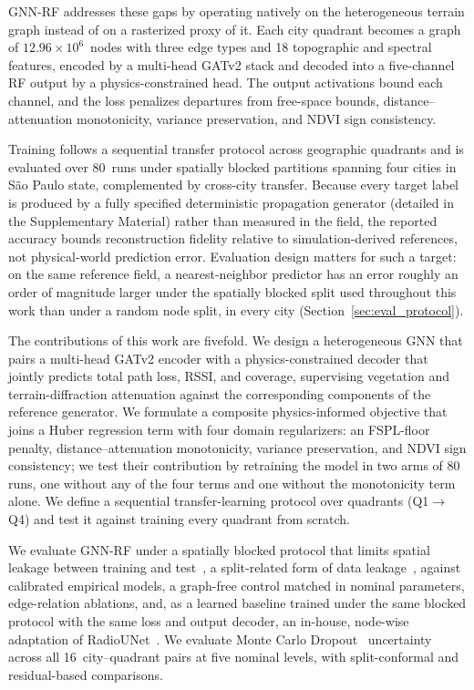 \documentclass{ieeeaccess}
\begin{document}
GNN-RF addresses these gaps by operating natively on the heterogeneous terrain graph instead of on a rasterized proxy of it. Each city quadrant becomes a graph of $12.96 \times 10^6$~nodes with three edge types and 18 topographic and spectral features, encoded by a multi-head GATv2 stack and decoded into a five-channel RF output by a physics-constrained head. The output activations bound each channel, and the loss penalizes departures from free-space bounds, distance--attenuation monotonicity, variance preservation, and NDVI sign consistency.

Training follows a sequential transfer protocol across geographic quadrants and is evaluated over 80~runs under spatially blocked partitions spanning four cities in S\~{a}o Paulo state, complemented by cross-city transfer. Because every target label is produced by a fully specified deterministic propagation generator (detailed in the Supplementary Material) rather than measured in the field, the reported accuracy bounds reconstruction fidelity relative to simulation-derived references, not physical-world prediction error. Evaluation design matters for such a target: on the same reference field, a nearest-neighbor predictor has an error roughly an order of magnitude larger under the spatially blocked split used throughout this work than under a random node split, in every city (Section~\ref{sec:eval_protocol}).

The contributions of this work are fivefold. We design a heterogeneous GNN that pairs a multi-head GATv2 encoder with a physics-constrained decoder that jointly predicts total path loss, RSSI, and coverage, supervising vegetation and terrain-diffraction attenuation against the corresponding components of the reference generator. We formulate a composite physics-informed objective that joins a Huber regression term with four domain regularizers: an FSPL-floor penalty, distance--attenuation monotonicity, variance preservation, and NDVI sign consistency; we test their contribution by retraining the model in two arms of 80 runs, one without any of the four terms and one without the monotonicity term alone. We define a sequential transfer-learning protocol over quadrants (Q1$\to$Q4) and test it against training every quadrant from scratch.

We evaluate GNN-RF under a spatially blocked protocol that limits spatial leakage between training and test~\cite{roberts2017cross}, a split-related form of data leakage~\cite{apicella2025don}, against calibrated empirical models, a graph-free control matched in nominal parameters, edge-relation ablations, and, as a learned baseline trained under the same blocked protocol with the same loss and output decoder, an in-house, node-wise adaptation of RadioUNet~\cite{levie2021radiounet}. We evaluate Monte Carlo Dropout~\cite{gal2016dropout} uncertainty across all 16~city--quadrant pairs at five nominal levels, with split-conformal and residual-based comparisons.
\end{document}
